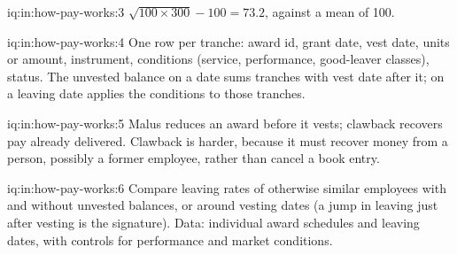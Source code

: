 \begin{solution}{iq:in:how-pay-works:3}
$\sqrt{100\times300}-100=73.2$, against a mean of 100.
\end{solution}

\begin{solution}{iq:in:how-pay-works:4}
One row per tranche: award id, grant date, vest date, units or amount, instrument, conditions (service, performance,
good-leaver classes), status. The unvested balance on a date sums tranches with vest date after it;  on a
leaving date applies the conditions to those tranches.
\end{solution}

\begin{solution}{iq:in:how-pay-works:5}
Malus reduces an award before it vests; clawback recovers pay already delivered. Clawback is harder, because it must
recover money from a person, possibly a former employee, rather than cancel a book entry.
\end{solution}

\begin{solution}{iq:in:how-pay-works:6}
Compare leaving rates of otherwise similar employees with and without unvested balances, or around vesting dates (a
jump in leaving just after vesting is the signature). Data: individual award schedules and leaving dates, with controls
for performance and market conditions.
\end{solution}

